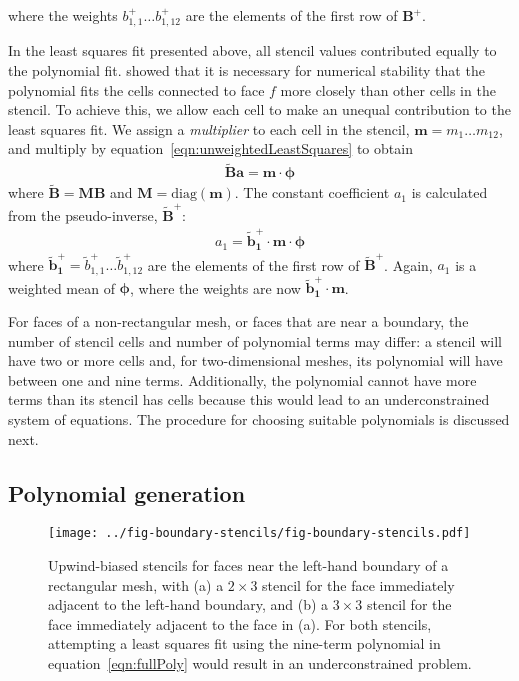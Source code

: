 where the weights $b_{1,1}^+ \ldots b_{1,12}^+$ are the elements of the first row of $\mathbf{B}^+$.

In the least squares fit presented above, all stencil values contributed equally to the polynomial fit.
\citet{lashley2002} showed that it is necessary for numerical stability that the polynomial fits the cells connected to face $f$ more closely than other cells in the stencil.
To achieve this, we allow each cell to make an unequal contribution to the least squares fit.
We assign a \textit{multiplier} to each cell in the stencil, $\mathbf{m} = m_1 \ldots m_{12}$, and multiply by equation~\eqref{eqn:unweightedLeastSquares} to obtain
\begin{align}
	\mathbf{\tilde{B}} \mathbf{a} = \mathbf{m} \cdot \bm{\phi}
\end{align}
where $\mathbf{\tilde{B}} = \mathbf{M} \mathbf{B}$ and $\mathbf{M} = \mathrm{diag}(\mathbf{m})$.  The constant coefficient $a_1$ is calculated from the pseudo-inverse, $\mathbf{\tilde{B}}^+$:
\begin{align}
	a_1 = \mathbf{\tilde{b}_1^+} \cdot \mathbf{m} \cdot \mathbf{\phi} \label{eqn:weightedPinv}
\end{align}
where $\mathbf{\tilde{b}_1^+} = \tilde{b}_{1,1}^+ \ldots \tilde{b}_{1,12}^+$ are the elements of the first row of $\mathbf{\tilde{B}}^+$.  Again, $a_1$ is a weighted mean of $\bm{\phi}$, where the weights are now $\mathbf{\tilde{b}_1^+} \cdot \mathbf{m}$.

For faces of a non-rectangular mesh, or faces that are near a boundary, the number of stencil cells and number of polynomial terms may differ: a stencil will have two or more cells and, for two-dimensional meshes, its polynomial will have between one and nine terms.  Additionally, the polynomial cannot have more terms than its stencil has cells because this would lead to an underconstrained system of equations.  The procedure for choosing suitable polynomials is discussed next.

\subsection{Polynomial generation}
\begin{figure}
	\centering
	\texttt{[image: ../fig-boundary-stencils/fig-boundary-stencils.pdf]}
	\caption{Upwind-biased stencils for faces near the left-hand boundary of a rectangular mesh, with (a) a $2 \times 3$ stencil for the face immediately adjacent to the left-hand boundary, and (b) a $3 \times 3$ stencil for the face immediately adjacent to the face in (a).  For both stencils, attempting a least squares fit using the nine-term polynomial in equation~\eqref{eqn:fullPoly} would result in an underconstrained problem.}
	\label{fig:boundaryStencils}
\end{figure}

